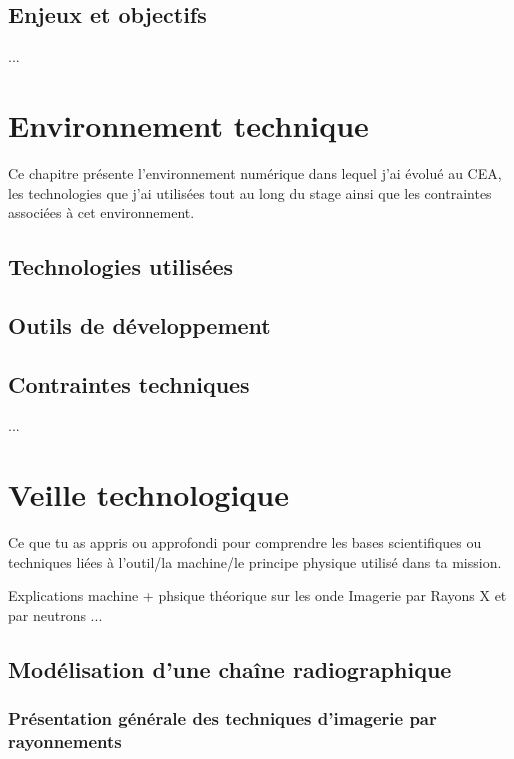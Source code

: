 \documentclass[12pt,a4paper]{report}
\begin{document}
\section{Enjeux et objectifs}
... %



\chapter{Environnement technique}

Ce chapitre présente l'environnement numérique dans lequel j'ai évolué au CEA, les technologies que j'ai utilisées tout au long du stage ainsi que les contraintes associées à cet environnement.

\section{Technologies utilisées}
\section{Outils de développement}
\section{Contraintes techniques}
... %

\chapter{Veille technologique}
Ce que tu as appris ou approfondi pour comprendre les bases scientifiques ou techniques liées à l’outil/la machine/le principe physique utilisé dans ta mission.

Explications machine + phsique théorique sur les onde
Imagerie par Rayons X et par neutrons
... %
\section{Modélisation d'une chaîne radiographique}
\subsection{Présentation générale des techniques d'imagerie par rayonnements}
\end{document}
